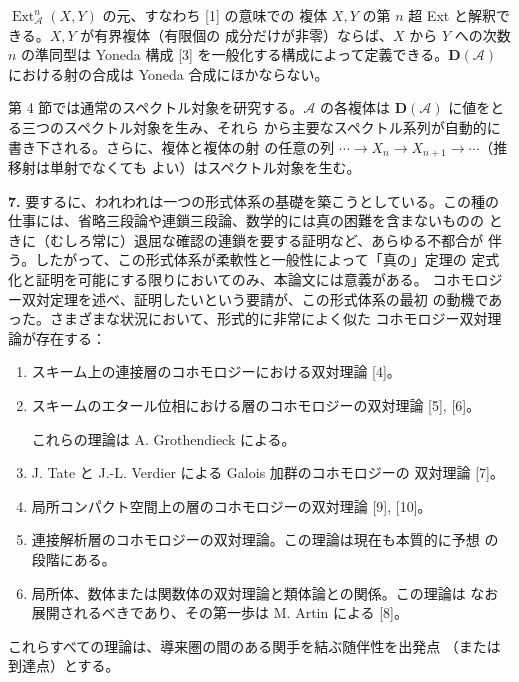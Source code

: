 \clearpage
{}
$\operatorname{Ext}_{\mathcal A}^{n}(X,Y)$ の元、すなわち [1] の意味での
複体 $X,Y$ の第 $n$ 超 Ext と解釈できる。$X,Y$ が有界複体（有限個の
成分だけが非零）ならば、$X$ から $Y$ への次数 $n$ の準同型は Yoneda
構成 [3] を一般化する構成によって定義できる。$\mathbf D(\mathcal A)$
における射の合成は Yoneda 合成にほかならない。

第 4 節では通常のスペクトル対象を研究する。$\mathcal A$ の各複体は
$\mathbf D(\mathcal A)$ に値をとる三つのスペクトル対象を生み、それら
から主要なスペクトル系列が自動的に書き下される。さらに、複体と複体の射
の任意の列 $\cdots\to X_n\to X_{n+1}\to\cdots$（推移射は単射でなくても
よい）はスペクトル対象を生む。

\noindent\textbf{7.}\quad
要するに、われわれは一つの形式体系の基礎を築こうとしている。この種の
仕事には、省略三段論や連鎖三段論、数学的には真の困難を含まないものの
ときに（むしろ常に）退屈な確認の連鎖を要する証明など、あらゆる不都合が
伴う。したがって、この形式体系が柔軟性と一般性によって「真の」定理の
定式化と証明を可能にする限りにおいてのみ、本論文には意義がある。
コホモロジー双対定理を述べ、証明したいという要請が、この形式体系の最初
の動機であった。さまざまな状況において、形式的に非常によく似た
コホモロジー双対理論が存在する：

\begin{enumerate}
\renewcommand{\labelenumi}{\arabic{enumi})}
\item スキーム上の連接層のコホモロジーにおける双対理論 [4]。

\item スキームのエタール位相における層のコホモロジーの双対理論 [5], [6]。

これらの理論は A. Grothendieck による。

\item J. Tate と J.-L. Verdier による Galois 加群のコホモロジーの
双対理論 [7]。

\item 局所コンパクト空間上の層のコホモロジーの双対理論 [9], [10]。

\item 連接解析層のコホモロジーの双対理論。この理論は現在も本質的に予想
の段階にある。

\item 局所体、数体または関数体の双対理論と類体論との関係。この理論は
なお展開されるべきであり、その第一歩は M. Artin による [8]。
\end{enumerate}

これらすべての理論は、導来圏の間のある関手を結ぶ随伴性を出発点
（または到達点）とする。
